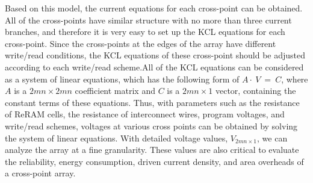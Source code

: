 Based on this model, the current equations for each cross-point can be
obtained. All of the cross-points have similar structure with no more than
three current branches, and therefore it is very easy to set up the KCL
equations for each cross-point. Since the cross-points at the edges of the
array have different write/read conditions, the KCL equations of these
cross-point should be adjusted according to each write/read scheme.All of
the KCL equations can be considered as a system of linear equations, which
has the following form of {$ A\cdot~V~=~C $}, where $A$ is a
${2mn\times{2mn}}$ coefficient matrix and $C$ is a ${2mn\times{1}}$
vector, containing the constant terms of these equations. Thus, with
parameters such as the resistance of ReRAM cells, the resistance of
interconnect wires, program voltages, and write/read schemes, voltages at
various cross points can be obtained by solving the system of linear
equations. With detailed voltage values, $V_{2mn{\times}1}$, we can
analyze the array at a fine granularity. These values are also critical to
evaluate the reliability, energy consumption, driven current density, and
area overheads of a cross-point array.

